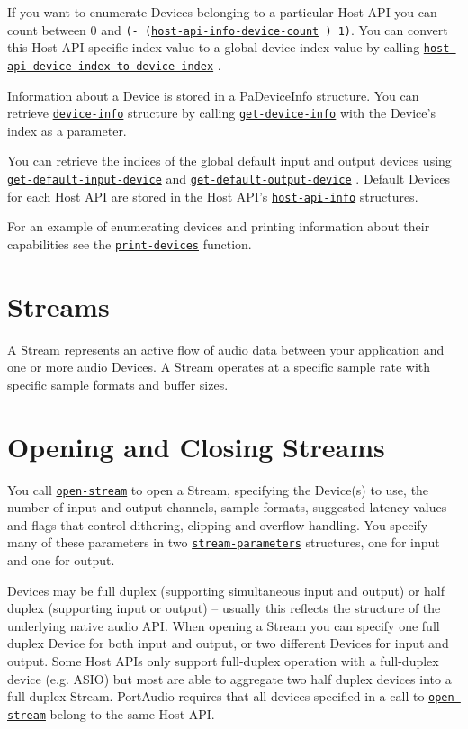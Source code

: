 \documentclass[a4paper]{report}
\begin{document}
If you want to enumerate Devices belonging to a particular Host API you can count between 0 and \texttt{(- (\hyperref[portaudio__fun__host-api-info-device-count]{\texttt{host-api-info-device-count}}
  ) 1)}. You can convert this Host API-specific index value to a global device-index value by calling \hyperref[portaudio__fun__host-api-device-index-to-device-index]{\texttt{host-api-device-index-to-device-index}}
  .

Information about a Device is stored in a PaDeviceInfo structure. You can retrieve \hyperref[portaudio__class__device-info]{\texttt{device-info}}
   structure by calling \hyperref[portaudio__fun__get-device-info]{\texttt{get-device-info}}
   with the Device's index as a parameter.

You can retrieve the indices of the global default input and output devices using \hyperref[portaudio__fun__get-default-input-device]{\texttt{get-default-input-device}}
   and \hyperref[portaudio__fun__get-default-output-device]{\texttt{get-default-output-device}}
  . Default Devices for each Host API are stored in the Host API's \hyperref[portaudio__class__host-api-info]{\texttt{host-api-info}}
   structures.

For an example of enumerating devices and printing information about their capabilities see the \hyperref[portaudio__fun__print-devices]{\texttt{print-devices}}
   function.\section{Streams} \label{d0d0e0e0e0e7}
A Stream represents an active flow of audio data between your application and one or more audio Devices. A Stream operates at a specific sample rate with specific sample formats and buffer sizes.\section{Opening and Closing Streams} \label{d0d0e0e0e0e8}You call \hyperref[portaudio__fun__open-stream]{\texttt{open-stream}}
   to open a Stream, specifying the Device(s) to use, the number of input and output channels, sample formats, suggested latency values and flags that control dithering, clipping and overflow handling. You specify many of these parameters in two \hyperref[portaudio__class__stream-parameters]{\texttt{stream-parameters}}
   structures, one for input and one for output.

Devices may be full duplex (supporting simultaneous input and output) or half duplex (supporting input or output) – usually this reflects the structure of the underlying native audio API. When opening a Stream you can specify one full duplex Device for both input and output, or two different Devices for input and output. Some Host APIs only support full-duplex operation with a full-duplex device (e.g. ASIO) but most are able to aggregate two half duplex devices into a full duplex Stream. PortAudio requires that all devices specified in a call to \hyperref[portaudio__fun__open-stream]{\texttt{open-stream}}
   belong to the same Host API.
\end{document}
